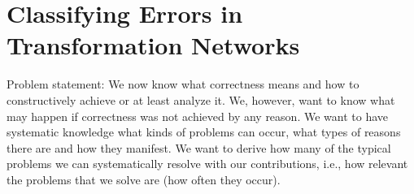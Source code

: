\chapter{Classifying Errors in Transformation Networks 
}
\label{chap:errors}

Problem statement: We now know what correctness means and how to constructively achieve or at least analyze it. We, however, want to know what may happen if correctness was not achieved by any reason.
We want to have systematic knowledge what kinds of problems can occur, what types of reasons there are and how they manifest.
We want to derive how many of the typical problems we can systematically resolve with our contributions, i.e., how relevant the problems that we solve are (how often they occur).




